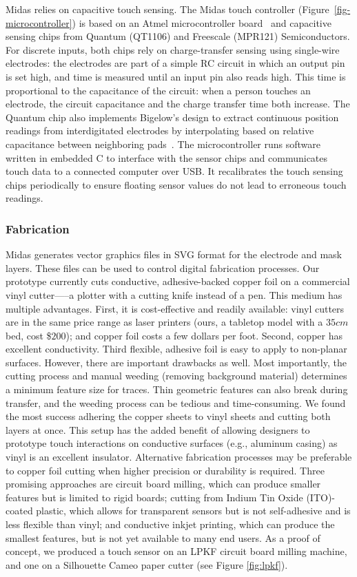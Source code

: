         Midas relies on capacitive touch sensing. The Midas touch controller (Figure~\ref{fig-microcontroller}) is based on an Atmel microcontroller board~\cite{teensy} and capacitive sensing chips from Quantum (QT1106) and Freescale (MPR121) Semiconductors. For discrete inputs, both chips rely on charge-transfer sensing using single-wire electrodes: the electrodes are part of a simple RC circuit in which an output pin is set high, and time is measured until an input pin also reads high. This time is proportional to the capacitance of the circuit: when a person touches an electrode, the circuit capacitance and the charge transfer time both increase. The Quantum chip also implements Bigelow's design to extract continuous position readings from interdigitated electrodes by interpolating based on relative capacitance between neighboring pads~\cite{bigelow-interdigitated}. The microcontroller runs software written in embedded C to interface with the sensor chips and communicates touch data to a connected computer over USB. It recalibrates the touch sensing chips periodically to ensure floating sensor values do not lead to erroneous touch readings.

    \subsubsection{Fabrication}

Midas generates vector graphics files in SVG format for the
electrode and mask layers. These files can be used to control
digital fabrication processes. Our prototype currently
cuts conductive, adhesive-backed copper foil on a commercial
vinyl cutter—--a plotter with a cutting knife instead of a
pen. This medium has multiple advantages. First, it is cost-effective
and readily available: vinyl cutters are in the same
price range as laser printers (ours, a tabletop model with a
$35cm$ bed, cost \$$200$); and copper foil costs a few dollars
per foot. Second, copper has excellent conductivity. Third
flexible, adhesive foil is easy to apply to non-planar surfaces.
However, there are important drawbacks as well. Most importantly,
the cutting process and manual weeding (removing
background material) determines a minimum feature size
for traces. Thin geometric features can also break during
transfer, and the weeding process can be tedious and time-consuming.
We found the most success adhering
the copper sheets to vinyl sheets and cutting both layers at
once. This setup has the added benefit of allowing designers
to prototype touch interactions on conductive surfaces (e.g.,
aluminum casing) as vinyl is an excellent insulator.
Alternative fabrication processes may be preferable to copper
foil cutting when higher precision or durability is required.
Three promising approaches are circuit board milling, which
can produce smaller features but is limited to rigid boards; cutting from Indium Tin Oxide (ITO)-coated plastic, which allows for transparent sensors but is not self-adhesive and is less flexible than vinyl;
and conductive inkjet printing, which can produce the smallest
features, but is not yet available to many end users. As
a proof of concept, we produced a touch sensor on an LPKF
circuit board milling machine, and one on a Silhouette Cameo paper cutter (see Figure \ref{fig:lpkf}).


